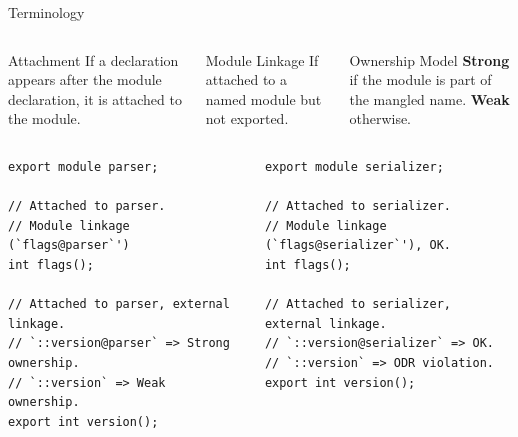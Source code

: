\documentclass[]{beamer}
\begin{document}
\begin{frame}[t,containsverbatim]{Terminology}

  \begin{columns}[t]
    \begin{column}{0.3\textwidth}
      \begin{block}{\footnotesize Attachment}
        \justifying \footnotesize If a declaration appears after the module declaration, it is attached to the module.
      \end{block}
    \end{column}

    \begin{column}{0.3\textwidth}
      \begin{block}{\footnotesize Module Linkage}
        \justifying   \footnotesize If attached to a named module but not exported.
      \end{block}
    \end{column}

    \begin{column}{0.3\textwidth}
      \begin{block}{\footnotesize Ownership Model}
        \justifying \footnotesize \textbf{Strong} if the module is part of the mangled name. \textbf{Weak} otherwise.
      \end{block}
    \end{column}
  \end{columns}

  \vspace{0.5em}

  \begin{columns}
    \begin{column}{0.5\textwidth}
      \begin{verbatim}
export module parser;

// Attached to parser.
// Module linkage (`flags@parser`')
int flags();

// Attached to parser, external linkage.
// `::version@parser` => Strong ownership.
// `::version` => Weak ownership.
export int version();
\end{verbatim}
    \end{column}
    \begin{column}{0.5\textwidth}
      \begin{verbatim}
export module serializer;

// Attached to serializer.
// Module linkage (`flags@serializer`'), OK.
int flags();

// Attached to serializer, external linkage.
// `::version@serializer` => OK.
// `::version` => ODR violation.
export int version();
  \end{verbatim}
    \end{column}
  \end{columns}
\end{frame}
\end{document}
